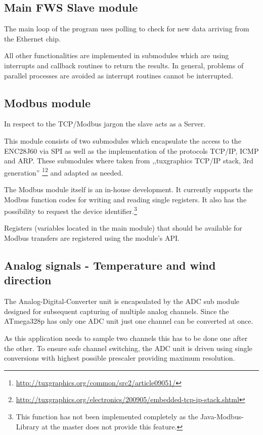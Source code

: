 \subsection{Main FWS Slave module}
The main loop of the program uses polling to check for new data arriving from the Ethernet chip.

All other functionalities are implemented in submodules which are using interrupts and callback routines to return the results. In general, problems of parallel processes are avoided as interrupt routines cannot be interrupted.

\subsection{Modbus module}
In respect to the TCP/Modbus jargon the slave acts as a Server.

This module consists of two submodules which encapsulate the access to the ENC28J60 via SPI as well as the implementation of the protocols TCP/IP, ICMP and ARP. These submodules where taken from ,,tuxgraphics TCP/IP stack, 3rd generation'' \footnote{\url{http://tuxgraphics.org/common/src2/article09051/}}\footnote{\url{http://tuxgraphics.org/electronics/200905/embedded-tcp-ip-stack.shtml}} and adapted as needed.

The Modbus module itself is an in-house development. It currently supports the Modbus function codes for writing and reading single registers. It also has the possibility to request the device identifier.\footnote{This function has not been implemented completely as the Java-Modbus-Library at the master does not provide this feature.}	

Registers (variables located in the main module) that should be available for Modbus transfers are registered using the module's API.

\subsection{Analog signals - Temperature and wind direction}
The Analog-Digital-Converter unit is encapsulated by the ADC sub module designed for subsequent capturing of multiple analog channels.
Since the ATmega328p has only one ADC unit just one channel can be converted at once.

As this application needs to sample two channels this has to be done one after the other. To ensure safe channel switching, the ADC unit is driven using single conversions with highest possible prescaler providing maximum resolution.


